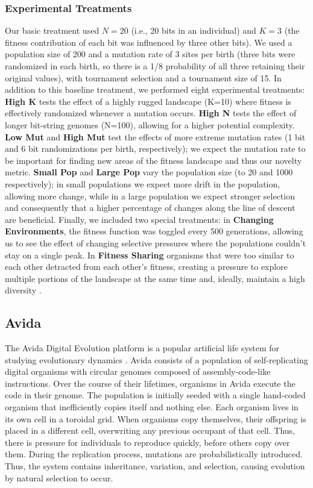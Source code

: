 \documentclass[letterpaper]{article}
\begin{document}
\subsubsection{Experimental Treatments}
Our basic treatment used $N=20$ (i.e., 20 bits in an individual) and $K=3$ (the fitness contribution of each bit was influenced by three other bits).  We used a population size of 200 and a mutation rate of 3 sites per birth (three bits were randomized in each birth, so there is a 1/8 probability of all three retaining their original values), with tournament selection and a tournament size of 15.
In addition to this baseline
treatment, we performed eight experimental treatments: \textbf{High K} tests the effect of a highly rugged landscape (K=10) where fitness is effectively randomized whenever a mutation occurs.  \textbf{High N} tests the effect of longer bit-string genomes (N=100), allowing for a higher potential complexity.  \textbf{Low Mut} and \textbf{High Mut} test the effects of more extreme mutation rates (1 bit and 6 bit randomizations per birth, respectively); we expect the mutation rate to be important for finding new areas of the fitness landscape and thus our novelty metric.  \textbf{Small Pop} and \textbf{Large Pop} vary the population size (to 20 and 1000 respectively); in small populations we expect more drift in the population, allowing more change, while in a large population we expect stronger selection and consequently that a higher percentage of changes along the line of descent are beneficial.  Finally, we included two special treatments: in \textbf{Changing Environments}, the fitness function was toggled every 500 generations, allowing us to see the effect of changing selective pressures where the populations couldn't stay on a single peak.  In \textbf{Fitness Sharing} organisms that were too similar to each other detracted from each other's fitness, creating a pressure to explore multiple portions of the landscape at the same time and, ideally, maintain a high diversity  \citep{goldberg_genetic_1987}.

\subsection{Avida}

The Avida Digital Evolution platform is a popular artificial life system for studying evolutionary dynamics \citep{ofria_avida:_2004}. Avida consists of a population of self-replicating digital organisms with circular genomes composed of assembly-code-like instructions. Over the course of their lifetimes, organisms in Avida execute the code in their genome. The population is initially seeded with a single hand-coded organism that inefficiently copies itself and nothing else. Each organism lives in its own cell in a toroidal grid. When organisms copy themselves, their offspring is placed in a different cell, overwriting any previous occupant of that cell. Thus, there is pressure for individuals to reproduce quickly, before others copy over them. During the replication process, mutations are probabilistically introduced. Thus, the system contains inheritance, variation, and selection, causing evolution by natural selection to occur.
\end{document}
